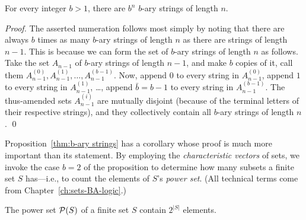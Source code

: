 \begin{prop}
\label{thm:b-ary strings}
For every integer $b > 1$, there are $b^n$ $b$-ary strings of length $n$.
\end{prop}

\begin{proof}
The asserted numeration follows most simply by noting that there are always $b$ times as many $b$-ary strings of length $n$ as there are strings of length $n-1$.  This is because we can form the set of $b$-ary strings of length $n$ as follows.  Take the set $A_{n-1}$ of $b$-ary strings of length $n-1$, and make $b$ copies of it, call them $A^{(0)}_{n-1}, A^{(1)}_{n-1}, \ldots, A^{(b-1)}_{n-1}$.  Now, append $0$ to every string in $A^{(0)}_{n-1}$, append $1$ to every string in
$A^{(1)}_{n-1}$, \ldots, append $\bar{b} = b-1$ to every string in $A^{(b-1)}_{n-1}$.  The thus-amended sets $A^{(i)}_{n-1}$ are mutually disjoint (because of the terminal letters of their respective strings), and they collectively contain all $b$-ary strings of length $n$.  \qed
\end{proof}

\medskip

 

Proposition~\ref{thm:b-ary strings} has a corollary whose proof is much more important than its
statement.  By employing the {\em characteristic vectors} of sets, we invoke the case $b=2$ of the
proposition to determine how many subsets a finite set $S$ has---i.e., to
count the elements of $S$'s {\em power set}.  (All technical terms come from Chapter~\ref{ch:sets-BA-logic}.)

\begin{prop}
\label{thm:power-sets}
The power set $\mbox{$\cal P$}(S)$ of a finite set $S$ contain $2^{|S|}$ elements.
\end{prop}

